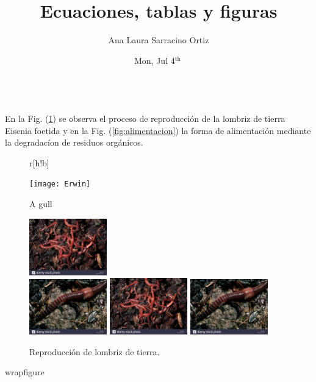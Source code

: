 \documentclass {article}
\author{Ana Laura Sarracino Ortiz}
\date{Mon, Jul 4$^{\text {th }}$}
\title{\sc Ecuaciones, tablas y figuras}
\begin{document}
\maketitle{}	
\thispagestyle{empty}

\blindtext
\\

\vspace{1cm}
En la Fig. (\ref{fig:reproduccion}) se observa el proceso de reproducci\'on de la lombriz de tierra Eisenia foetida y en la Fig. (\ref{fig:alimentacion}) la forma de alimentaci\'on mediante la degradac\'ion de residuos org\'anicos.

\begin{figure}{r}[h!b] %
  \vspace{-20pt}
  \begin{center}
    \texttt{[image: Erwin]}
  \end{center}
  \vspace{-20pt}
  \caption{A gull}
  \vspace{-10pt}
	\centering
	\includegraphics[width=0.3\textwidth]{vectorial} \\ %
	\includegraphics[width=0.3\textwidth]{vectorial2}
	\includegraphics[width=0.3\textwidth]{vectorial}
	\includegraphics[width=0.3\textwidth]{vectorial2} %
	\caption{Reproducci\'on de lombriz de tierra.} %
	\label{fig:reproduccion} %
\end{figure}{wrapfigure}
\end{document}
